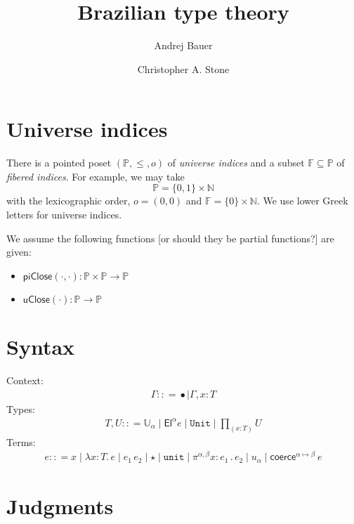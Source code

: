 \documentclass{article}
\newcommand{\NN}{\mathbb{N}} %
\newcommand{\PP}{\mathbb{P}} %
\newcommand{\FF}{\mathbb{F}} %
\newcommand{\zero}{o} %
\newcommand{\piClose}[2]{\mathsf{piClose}(#1,#2)}   %
\newcommand{\uClose}[1]{\mathsf{uClose}(#1)}  %
\newcommand{\G}{\Gamma} %
\newcommand{\T}{T} %
\newcommand{\U}{U} %
\newcommand{\x}{x} %
\newcommand{\e}{e} %
\newcommand{\bnf}{\mathrel{{:}{:}{=}}}
\newcommand{\bnfor}{\mid}
\newcommand{\ctxempty}{\bullet} %
\newcommand{\ctxextend}[3]{#1, #2 {:} #3} %
\newcommand{\Universe}[1]{\mathbb{U}_{#1}} %
\newcommand{\El}[2]{\mathsf{El}^{#1} #2} %
\newcommand{\Unit}{\mathtt{Unit}} %
\newcommand{\Prod}[2]{{\textstyle\prod_{(#1 {:} #2)}}} %
\newcommand{\lam}[2]{\lambda #1 {:} #2 .\,} %
\newcommand{\app}[2]{#1\,#2} %
\newcommand{\unitTerm}{\star} %
\newcommand{\nUnit}{\mathtt{unit}} %
\newcommand{\nProd}[3]{\pi^{#1} #2 {:} #3 \,.\,} %
\newcommand{\nUniverse}[1]{u_{#1}}  %
\newcommand{\coerce}[3]{\mathsf{coerce}^{#2{\mapsto}#3}\ #1}
\begin{document}
\title{Brazilian type theory}
\author{Andrej Bauer \and Christopher A. Stone}
\maketitle

\section{Universe indices}
\label{sec:universe-indices}

There is a pointed poset $(\PP, {\leq}, \zero)$ of \emph{universe
  indices} and a subset $\FF \subseteq \PP$ of \emph{fibered indices}.
For example, we may take
%
\begin{equation*}
  \PP = \{0,1\} \times \NN
\end{equation*}
%
with the lexicographic order, $\zero = (0,0)$ and $\FF = \{0\} \times
\NN$. We use lower Greek letters for universe indices.

We assume the following functions [or should they be partial functions?] are given:
\begin{itemize}
  \item $\piClose{\cdot}{\cdot} : \PP \times \PP \to \PP$
  \item $\uClose{\cdot}  : \PP \to \PP$
\end{itemize}
\section{Syntax}
\label{sec:syntax}

Context:
%
\begin{align*}
  \G \bnf
  \ctxempty \bnfor
  \ctxextend{\G}{\x}{\T}
\end{align*}
%
Types:
%
\begin{align*}
  \T, \U \bnf
  \Universe{\alpha} \bnfor
  \El{\alpha}{\e} \bnfor
  \Unit \bnfor
  \Prod{x}{\T} \U
\end{align*}
%
Terms:
%
\begin{align*}
  \e \bnf
  \x \bnfor
  \lam{\x}{\T} \e \bnfor
  \app{\e_1}{\e_2} \bnfor
  \unitTerm \bnfor
  \nUnit \bnfor
  \nProd{\alpha,\beta}{\x}{\e_1} \e_2 \bnfor
  \nUniverse{\alpha} \bnfor
  \coerce{\e}{\alpha}{\beta}
\end{align*}

\section{Judgments}
\label{sec:judgments}
\end{document}
